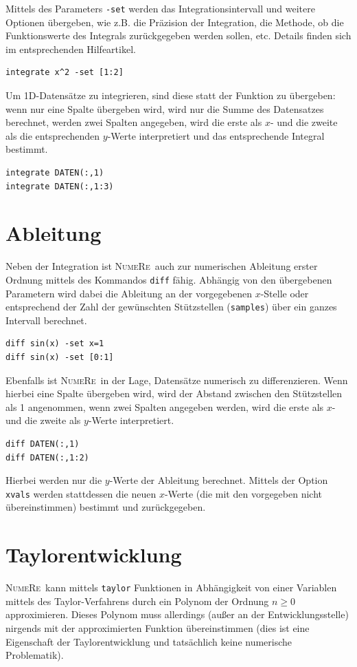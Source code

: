 \documentclass[DIV=14,headsepline,footsepline]{scrbook}
\newcommand{\NR}{\textsc{Nu\-me\-Re}}
\begin{document}
				Mittels des Parameters \lstinline+-set+ werden das Integrationsintervall und weitere Optionen übergeben, wie z.B. die Präzision der Integration, die Methode, ob die Funktionswerte des Integrals zurückgegeben werden sollen, etc. Details finden sich im entsprechenden Hilfeartikel.
				\begin{lstlisting}
integrate x^2 -set [1:2]
				\end{lstlisting}
				
				Um 1D-Datensätze zu integrieren, sind diese statt der Funktion zu übergeben: wenn nur eine Spalte übergeben wird, wird nur die Summe des Datensatzes berechnet, werden zwei Spalten angegeben, wird die erste als $x$- und die zweite als die entsprechenden $y$-Werte interpretiert und das entsprechende Integral bestimmt.
				\begin{lstlisting}
integrate DATEN(:,1)
integrate DATEN(:,1:3)
				\end{lstlisting}
				
			\section{Ableitung}
				Neben der Integration ist \NR\ auch zur numerischen Ableitung erster Ordnung mittels des Kommandos \lstinline+diff+ fähig. Abhängig von den übergebenen Parametern wird dabei die Ableitung an der vorgegebenen $x$-Stelle oder entsprechend der Zahl der gewünschten Stützstellen (\lstinline+samples+) über ein ganzes Intervall berechnet.
				\begin{lstlisting}
diff sin(x) -set x=1
diff sin(x) -set [0:1]
				\end{lstlisting}
				
				Ebenfalls ist \NR\ in der Lage, Datensätze numerisch zu differenzieren. Wenn hierbei eine Spalte übergeben wird, wird der Abstand zwischen den Stützstellen als 1 angenommen, wenn zwei Spalten angegeben werden, wird die erste als $x$- und die zweite als $y$-Werte interpretiert.
				\begin{lstlisting}
diff DATEN(:,1)
diff DATEN(:,1:2)
				\end{lstlisting}
				Hierbei werden nur die $y$-Werte der Ableitung berechnet. Mittels der Option \lstinline+xvals+ werden stattdessen die neuen $x$-Werte (die mit den vorgegeben nicht übereinstimmen) bestimmt und zurückgegeben.
				
			\section{Taylorentwicklung}
				\NR\ kann mittels \lstinline+taylor+ Funktionen in Abhängigkeit von einer Variablen mittels des Taylor-Verfahrens durch ein Polynom der Ordnung $n \geq 0$ approximieren. Dieses Polynom muss allerdings (außer an der Entwicklungsstelle) nirgends mit der approximierten Funktion übereinstimmen (dies ist eine Eigenschaft der Taylorentwicklung und tatsächlich keine numerische Problematik).
	
\end{document}
